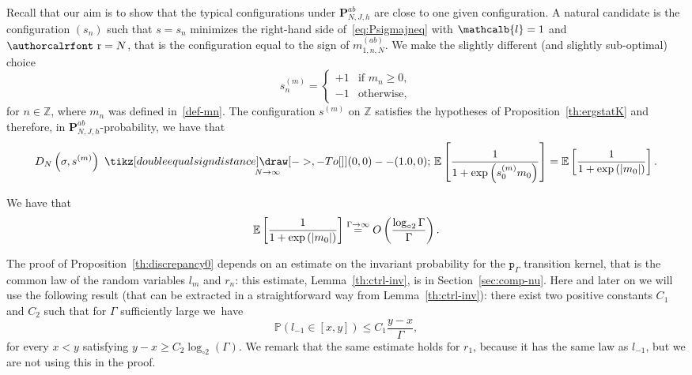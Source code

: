 \documentclass[10pt]{amsart}
\theoremstyle{definition}\newtheorem{defi}[theo]{Definition}\newtheorem{rema}[theo]{Remark}\newtheorem{exam}[theo]{Example}\newtheorem{exem}[theo]{Example}\newtheorem{nota}[theo]{Notation}
\newlength{\LETTERheight}
\newcommand*{\longto}[1]{\ %
{\tikz[double equal sign distance] \draw [->,-{To[]}] (0,0) -- (#1,0);}\ }
\newcommand{\mathcalc}[1]{\text{\authorcalrfont #1}}
\newcommand{\pp}{\mathtt{p}_\gG}
\newcommand{\bP}{\mathbf{P}}
\newcommand{\bbE}{\mathbb{E}}
\newcommand{\bbP}{\mathbb{P}}
\newcommand{\bbZ}{\mathbb{Z}}
\newcommand{\gG}{\Gamma}
\newcommand{\loglog}{\log_{\circ 2}}
\renewcommand{\ell}{\mathcalb{l}}
\newcommand{\err}{\mathcalc{r}}
\renewcommand*{\to}{\mathchoice{\longrightarrow}{\rightarrow}{\rightarrow}{\rightarrow}}
\begin{document}
Recall that our aim is to show that the typical configurations under $\bP_{N, J, h}^{ab}$ are close to one given configuration. A natural candidate is the configuration $(s_n)$ such that $s=s_n$ minimizes the right-hand side of~\eqref{eq:Psigmajneq} with $\ell=1$ and $\err=N$, that is the configuration equal to the sign of $m^{(ab)}_{1, n, N}$. We make the slightly different (and slightly sub-optimal) choice
\begin{equation}\label{eq:defsm}
s^{(m)}_n=
\begin{cases}
+1 &\text{if } m_n\ge 0,\\ 
-1 &\text{otherwise,}
\end{cases}
\end{equation}
for $n\in \bbZ$, where $m_n$ was defined in~\eqref{def-mn}. The configuration $s^{(m)}$ on $\bbZ$ satisfies the hypotheses of Proposition~\ref{th:ergstatK} and therefore, in $\bP_{N, J, h}^{ab}$-probability, we have that
\begin{equation}\label{eq:discrepgssm}
D_N\left(\sigma, s^{(m)}\right) \underset{N\to \infty}{\longto{1.0}} \bbE\left[\frac1{1+\exp\left(s^{(m)}_0 m_0\right)}\right]=\bbE\left[\frac1{1+\exp\left(|m_0|\right)}\right].
\end{equation}

\begin{prop}\label{th:discrepancy0}
We have that
\begin{equation}\label{eq:discrepancy0}
\bbE\left[\frac1{1+\exp\left(|m_0|\right)}\right]\overset{\gG \to \infty} = O \left(\frac{\loglog \gG}{\gG} \right).
\end{equation}
\end{prop}


The proof of Proposition~\ref{th:discrepancy0} depends on an estimate on the invariant probability for the $\pp$ transition kernel, that is the common law of the random variables $l_m$ and $r_n$: this estimate, Lemma~\ref{th:ctrl-inv}, is in Section~\ref{sec:comp-nu}. Here and later on we will use the following result (that can be extracted in a straightforward way from Lemma~\ref{th:ctrl-inv}): there exist two positive constants $C_1$ and $C_2$ such that for $\gG$ sufficiently large we~have
\begin{equation}\label{eq:fctrl-inv}
\bbP (l_{-1} \in [x, y])\le C_1 \frac{y-x}\gG,
\end{equation}
for every $x<y$ satisfying $y-x \ge C_2 \loglog (\gG)$. We remark that the same estimate holds for $r_{1}$, because it has the same law as $l_{-1}$, but we are not using this in the proof.
\end{document}
